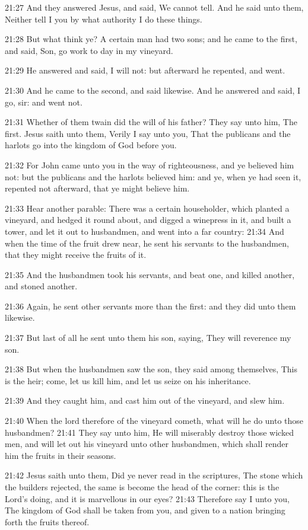 21:27 And they answered Jesus, and said, We cannot tell. And he said unto them, Neither tell I you by what authority I do these things.

21:28 But what think ye? A certain man had two sons; and he came to the first, and said, Son, go work to day in my vineyard.

21:29 He answered and said, I will not: but afterward he repented, and went.

21:30 And he came to the second, and said likewise. And he answered and said, I go, sir: and went not.

21:31 Whether of them twain did the will of his father? They say unto him, The first. Jesus saith unto them, Verily I say unto you, That the publicans and the harlots go into the kingdom of God before you.

21:32 For John came unto you in the way of righteousness, and ye believed him not: but the publicans and the harlots believed him: and ye, when ye had seen it, repented not afterward, that ye might believe him.

21:33 Hear another parable: There was a certain householder, which planted a vineyard, and hedged it round about, and digged a winepress in it, and built a tower, and let it out to husbandmen, and went into a far country: 21:34 And when the time of the fruit drew near, he sent his servants to the husbandmen, that they might receive the fruits of it.

21:35 And the husbandmen took his servants, and beat one, and killed another, and stoned another.

21:36 Again, he sent other servants more than the first: and they did unto them likewise.

21:37 But last of all he sent unto them his son, saying, They will reverence my son.

21:38 But when the husbandmen saw the son, they said among themselves, This is the heir; come, let us kill him, and let us seize on his inheritance.

21:39 And they caught him, and cast him out of the vineyard, and slew him.

21:40 When the lord therefore of the vineyard cometh, what will he do unto those husbandmen?  21:41 They say unto him, He will miserably destroy those wicked men, and will let out his vineyard unto other husbandmen, which shall render him the fruits in their seasons.

21:42 Jesus saith unto them, Did ye never read in the scriptures, The stone which the builders rejected, the same is become the head of the corner: this is the Lord's doing, and it is marvellous in our eyes?  21:43 Therefore say I unto you, The kingdom of God shall be taken from you, and given to a nation bringing forth the fruits thereof.

